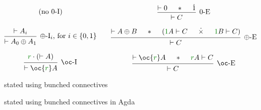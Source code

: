 \begin{figure}
\begin{displaymath}
\begin{matrix}
      \textrm{(no $0$-I)}
      &&
      \begin{prooftree}
        \hypo{\vdash 0}
        \hypo{\sep}
        \hypo{\dot1}
        \infer3[$0$-E]{\vdash C}
      \end{prooftree}
      \\\\
      \begin{prooftree}
        \hypo{\vdash A_i}
        \infer1[$\oplus$-I$_i$, for $i \in \{0,1\}$]{\vdash A_0 \oplus A_1}
      \end{prooftree}
      &&
      \begin{prooftree}
        \hypo{\vdash A \oplus B}
        \hypo{\sep}
        \hypo{(\gr1A \vdash C}
        \hypo{\dottimes}
        \hypo{\gr1B \vdash C)}
        \infer5[$\oplus$-E]{\vdash C}
      \end{prooftree}
      \\\\
      \begin{prooftree}
        \hypo{\gr r \cdot (\vdash A)}
        \infer1[$\oc$-I]{\vdash \oc{\gr r} A}
      \end{prooftree}
      &&
      \begin{prooftree}
        \hypo{\vdash \oc{\gr r} A}
        \hypo{\sep}
        \hypo{\gr rA \vdash C}
        \infer3[$\oc$-E]{\vdash C}
      \end{prooftree}
    \end{matrix}
  \end{displaymath}
  \caption{\name{} stated using bunched connectives}
  \label{fig:lr-bunched}
\end{figure}

\begin{figure}
  \caption{\name{} stated using bunched connectives in Agda}
  \label{fig:lr-bunched-Agda}
\end{figure}
